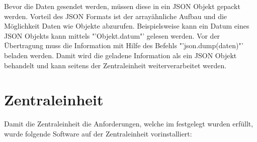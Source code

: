 Bevor die Daten gesendet werden, müssen diese in ein \ac{JSON} Objekt gepackt werden. Vorteil des \ac{JSON} Formats ist der arrayähnliche Aufbau und die Möglichkeit Daten wie Objekte abzurufen. Beispielsweise kann ein Datum eines \ac{JSON} Objekts kann mittels "'Objekt.datum"' gelesen werden. Vor der Übertragung muss die Information mit Hilfe des Befehls "'json.dump(daten)"' beladen werden. Damit wird die geladene Information als ein \ac{JSON} Objekt behandelt und kann seitens der Zentraleinheit weiterverarbeitet werden.
\section{Zentraleinheit}%
Damit die Zentraleinheit die Anforderungen, welche im  festgelegt wurden erfüllt, wurde folgende Software auf der Zentraleinheit vorinstalliert:
